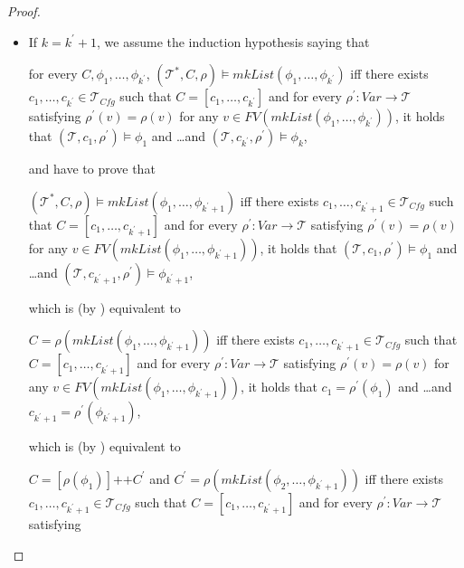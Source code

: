 \documentclass{article}
\newcommand{\Tcfg}{\mathcal{T}_{\mathit{Cfg}}}
\newenvironment{proofenv}
  {
    \VerbatimEnvironment\begin{tcolorbox}[colback=black!0!white] %
  }
  {
   \end{tcolorbox}
  }
\begin{document}
\begin{proof}
\begin{itemize}
    \item If $k = k^\prime + 1$, we assume the induction hypothesis saying that
    \begin{proofenv}
    for every $C, \phi_1, \ldots, \phi_{k^\prime}$,
    $(\mathcal{T}^*, C, \rho) \vDash \mathit{mkList}(\phi_1,\ldots,\phi_{k^\prime})$
    iff there exists $c_1, \ldots, c_{k^\prime} \in \Tcfg$ such that $C = [c_1, \ldots, c_{k^\prime}]$
    and for every $\rho^\prime : \mathit{Var} \to \mathcal{T}$ satisfying
    $\rho^\prime(v) = \rho(v)$ for any
    $v \in \mathit{FV}(\mathit{mkList}(\phi_1, \ldots, \phi_{k^\prime}))$,
    it holds that
    $(\mathcal{T}, c_1, \rho^\prime) \vDash \phi_1$ and \ldots and $(\mathcal{T}, c_{k^\prime}, \rho^\prime) \vDash \phi_k$,
    \end{proofenv}
    and have to prove that
    \begin{proofenv}
    $(\mathcal{T}^*, C, \rho) \vDash \mathit{mkList}(\phi_1,\ldots,\phi_{k^\prime + 1})$
    iff there exists $c_1, \ldots, c_{k^\prime + 1} \in \Tcfg$ such that $C = [c_1, \ldots, c_{k^\prime + 1}]$ and 
    for every $\rho^\prime : \mathit{Var} \to \mathcal{T}$ satisfying
    $\rho^\prime(v) = \rho(v)$ for any
    $v \in \mathit{FV}(\mathit{mkList}(\phi_1, \ldots, \phi_{k^\prime + 1}))$,
    it holds that
    $(\mathcal{T}, c_1, \rho^\prime) \vDash \phi_1$ and \ldots and $(\mathcal{T}, c_{k^\prime + 1}, \rho^\prime) \vDash \phi_{k^\prime + 1}$,
    \end{proofenv}
    which is (by ) equivalent to
    \begin{proofenv}
    $C = \rho(\mathit{mkList}(\phi_1,\ldots,\phi_{k^\prime + 1}))$
    iff there exists $c_1, \ldots, c_{k^\prime + 1} \in \Tcfg$ such that $C = [c_1, \ldots, c_{k^\prime + 1}]$
    and for every $\rho^\prime : \mathit{Var} \to \mathcal{T}$ satisfying
    $\rho^\prime(v) = \rho(v)$ for any
    $v \in \mathit{FV}(\mathit{mkList}(\phi_1, \ldots, \phi_{k^\prime + 1}))$,
    it holds that
    $c_1 = \rho^\prime(\phi_1)$ and \ldots and $c_{k^\prime + 1} = \rho^\prime(\phi_{k^\prime + 1})$,
    \end{proofenv}
    which is (by ) equivalent to
    \begin{proofenv}
    $C = [\rho(\phi_1)] \texttt{++} C^\prime$ and $C^\prime = \rho(\mathit{mkList}(\phi_2,\ldots,\phi_{k^\prime + 1}))$
    iff there exists $c_1, \ldots, c_{k^\prime + 1} \in \Tcfg$ such that $C = [c_1, \ldots, c_{k^\prime + 1}]$
    and for every $\rho^\prime : \mathit{Var} \to \mathcal{T}$ satisfying

\end{proofenv}
\end{itemize}
\end{proof}
\end{document}
